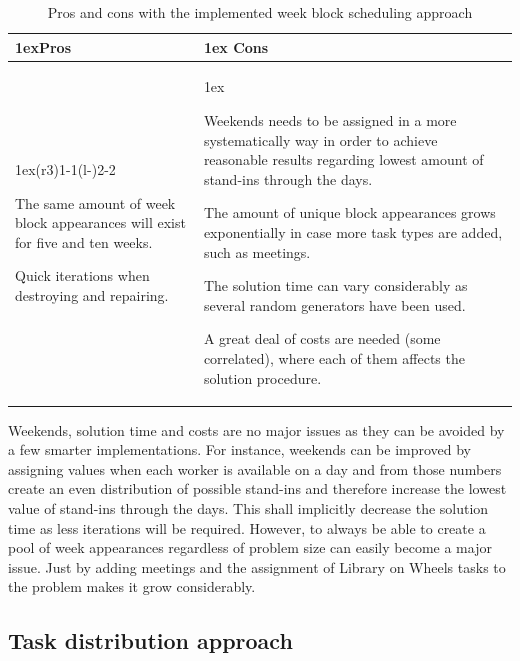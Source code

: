\begin{table}[!h]
\caption{Pros and cons with the implemented week block scheduling approach}
\label{pros_cons_weekly_scheduling}
\begin{tabularx}{\linewidth}{>{\parskip1ex}X@{\kern4\tabcolsep}>{\parskip1ex}X}
\toprule
\hfil\bfseries Pros
&
\hfil\bfseries Cons
\\\cmidrule(r{3\tabcolsep}){1-1}\cmidrule(l{-\tabcolsep}){2-2}

The same amount of week block appearances will exist for five and ten weeks.\par
Quick iterations when destroying and repairing.\par

&

Weekends needs to be assigned in a more systematically way in order to achieve reasonable results regarding lowest amount of stand-ins through the days.\par
The amount of unique block appearances grows exponentially in case more task types are added, such as meetings.\par
The solution time can vary considerably as several random generators have been used.\par
A great deal of costs are needed (some correlated), where each of them affects the solution procedure.

\\\bottomrule
\end{tabularx}
\end{table}

 Weekends, solution time and costs are no major issues as they can be avoided by a few smarter implementations. For instance, weekends can be improved by assigning values when each worker is available on a day and from those numbers create an even distribution of possible stand-ins and therefore increase the lowest value of stand-ins through the days. This shall implicitly decrease the solution time as less iterations will be required. However, to always be able to create a pool of week appearances regardless of problem size can easily become a major issue. Just by adding meetings and the assignment of Library on Wheels tasks to the problem makes it grow considerably.
 

\subsection{Task distribution approach}

